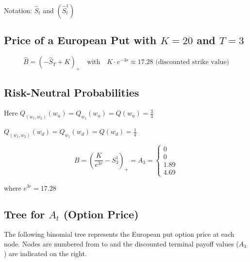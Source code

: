 \vspace{1cm}

\noindent Notation: $\hat{S}_t$ and $\left(\hat{S}_t^1\right)$

\vspace{1cm}

\subsection*{Price of a European Put with $K=20$ and $T=3$}

$$\hat{B} = \left(-\hat{S}_T + K\right)_+ \quad \text{with} \quad K \cdot e^{-3r} \approx 17.28 \text{ (discounted strike value)}$$

\newpage

\subsection*{Risk-Neutral Probabilities}

Here $Q_{(w_1,w_2)}(w_u) = Q_{w_1}(w_u) = Q(w_u) = \frac{3}{4}$

$Q_{(w_1,w_2)}(w_d) = Q_{w_1}(w_d) = Q(w_d) = \frac{1}{4}$

\vspace{0.5cm}

$$B = \left(\frac{K}{e^{3r}} - S_3^1\right)_+ = A_3 = \begin{cases}
0 \\
0 \\
1.89 \\
4.69
\end{cases}$$

where $e^{3r} = 17.28$

\subsection*{Tree for $A_t$ (Option Price)}

The following binomial tree represents the European put option price at each node. Nodes are numbered from  to  and the discounted terminal payoff values ($A_3$) are indicated on the right.

